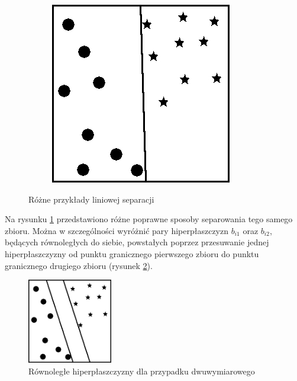 \begin{figure}[h!]
\begin{subfigure}[b]{0.33\textwidth}
    \end{subfigure}%
    \begin{subfigure}[b]{0.33\textwidth}
        \includegraphics[width=\linewidth]{img/granica_3.jpg}
    \end{subfigure}
    \caption{Różne przykłady liniowej separacji}
    \label{fig:liniowa_separacja}
\end{figure}

Na rysunku \ref{fig:liniowa_separacja} przedstawiono różne poprawne sposoby separowania tego samego zbioru. Można w szczególności wyróżnić pary hiperpłaszczyzn $b_{i1}$ oraz $b_{i2}$, będących równoległych do 
siebie, powstałych poprzez przesuwanie jednej hiperpłaszczyzny od punktu granicznego pierwszego zbioru do punktu granicznego drugiego zbioru (rysunek \ref{fig:rownolegla_separacja}).
\newpage
\begin{figure}[h!]
    \centering
    \includegraphics[width=0.33\textwidth]{img/granica_rownolegla.jpg}
    \caption{Równoległe hiperpłaszczyzny dla przypadku dwuwymiarowego}
    \label{fig:rownolegla_separacja}
\end{figure}

